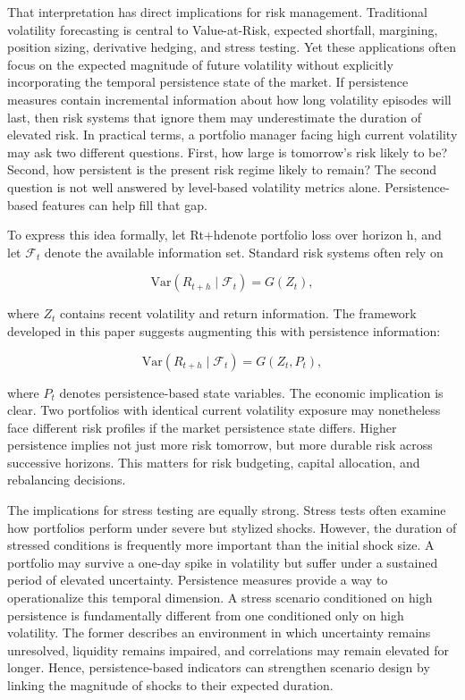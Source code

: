 \documentclass[12pt]{article}
\begin{document}
That interpretation has direct implications for risk management. Traditional volatility forecasting is central to Value-at-Risk, expected shortfall, margining, position sizing, derivative hedging, and stress testing. Yet these applications often focus on the expected magnitude of future volatility without explicitly incorporating the temporal persistence state of the market. If persistence measures contain incremental information about how long volatility episodes will last, then risk systems that ignore them may underestimate the duration of elevated risk. In practical terms, a portfolio manager facing high current volatility may ask two different questions. First, how large is tomorrow's risk likely to be? Second, how persistent is the present risk regime likely to remain? The second question is not well answered by level-based volatility metrics alone. Persistence-based features can help fill that gap.

To express this idea formally, let Rt+hdenote portfolio loss over horizon h, and let $\mathcal{F}_t$ denote the available information set. Standard risk systems often rely on

\[\mathrm{Var}(R_{t+h}\mid\mathcal{F}_t) = G(Z_t),\]

where $Z_t$ contains recent volatility and return information. The framework developed in this paper suggests augmenting this with persistence information:

\[\mathrm{Var}(R_{t+h}\mid\mathcal{F}_t) = G(Z_t, P_t),\]

where $P_t$ denotes persistence-based state variables. The economic implication is clear. Two portfolios with identical current volatility exposure may nonetheless face different risk profiles if the market persistence state differs. Higher persistence implies not just more risk tomorrow, but more durable risk across successive horizons. This matters for risk budgeting, capital allocation, and rebalancing decisions.

The implications for stress testing are equally strong. Stress tests often examine how portfolios perform under severe but stylized shocks. However, the duration of stressed conditions is frequently more important than the initial shock size. A portfolio may survive a one-day spike in volatility but suffer under a sustained period of elevated uncertainty. Persistence measures provide a way to operationalize this temporal dimension. A stress scenario conditioned on high persistence is fundamentally different from one conditioned only on high volatility. The former describes an environment in which uncertainty remains unresolved, liquidity remains impaired, and correlations may remain elevated for longer. Hence, persistence-based indicators can strengthen scenario design by linking the magnitude of shocks to their expected duration.
\end{document}
